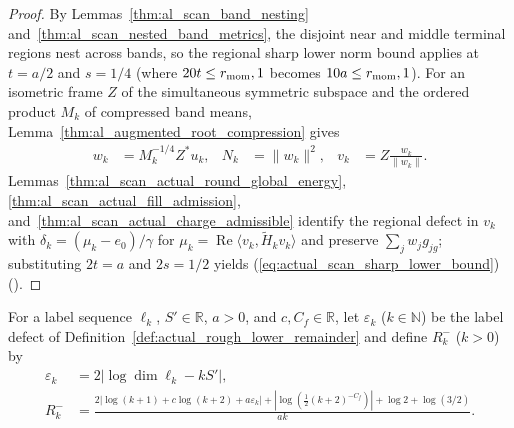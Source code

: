 \begin{proof}
    \leanok
    By Lemmas~\ref{thm:al_scan_band_nesting}
    and~\ref{thm:al_scan_nested_band_metrics}, the disjoint near and middle
    terminal regions nest across bands, so the regional sharp lower norm
    bound applies at $t=a/2$ and $s=1/4$ (where $20t\leq r_{\rm mom},1$
    becomes $10a\leq r_{\rm mom},1$). For an isometric frame $Z$ of the
    simultaneous symmetric subspace and the ordered product $M_k$ of
    compressed band means, Lemma~\ref{thm:al_augmented_root_compression}
    gives
    \begin{align}
        w_k & =M_k^{-1/4}Z^*u_k,
            & N_k                & =\|w_k\|^2,
            & v_k                & =Z\frac{w_k}{\|w_k\|}.
        \label{eq:actual_scan_root_compression}
    \end{align}
    Lemmas~\ref{thm:al_scan_actual_round_global_energy},
    \ref{thm:al_scan_actual_fill_admission},
    and~\ref{thm:al_scan_actual_charge_admissible} identify the regional
    defect in $v_k$ with $\delta_k=(\mu_k-e_0)/\gamma$ for
    $\mu_k=\operatorname{Re}\langle v_k,\widetilde H_kv_k\rangle$ and
    preserve $\sum_jw_jg_{jg}$; substituting $2t=a$ and $2s=1/2$ yields
    (\ref{eq:actual_scan_sharp_lower_bound})
    (\cite[Section~8]{OpenAI2026AreaLaw}).
\end{proof}

\begin{definition}
    \label{def:actual_sharp_lower_remainder}
    \leanok
    For a label sequence $\ell_k$, $S'\in\mathbb R$, $a>0$, and
    $c,C_f\in\mathbb R$, let $\varepsilon_k$ ($k\in\mathbb N$) be the label
    defect of Definition~\ref{def:actual_rough_lower_remainder} and define
    $R_k^-$ ($k>0$) by
    \begin{align}
        \varepsilon_k
              & =2\bigl|\log\dim\ell_k-kS'\bigr|,
        \label{eq:actual_sharp_lower_defect}      \\
        R_k^- & =\frac{
            2|\log(k+1)+c\log(k+2)+a\varepsilon_k|
            +|\log(\tfrac12(k+2)^{-C_f})|
            +\log2+\log(3/2)}{ak}.
        \label{eq:actual_sharp_lower_remainder}
    \end{align}
\end{definition}

